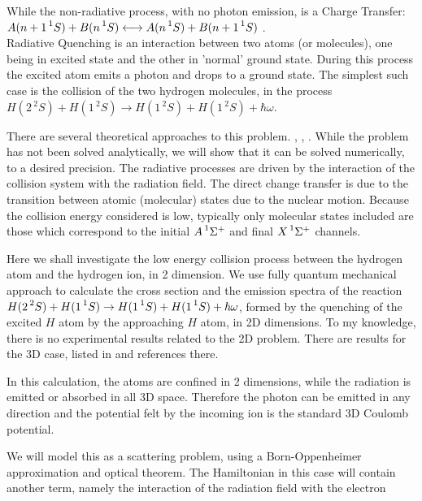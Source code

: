 While the non-radiative process, with no photon emission, is a Charge Transfer: \\
$ A(n+1\prescript{1}{}S) + B(n\prescript{1}{}S) \longleftrightarrow  A(n\prescript{1}{}S) + B(n+1\prescript{1}{}S) $ .\\

Radiative Quenching is an interaction between two atoms (or molecules), one being in excited state and the other in 'normal' ground state. During this process the excited atom emits a photon and drops to a ground state.
The simplest such case is the collision of the two hydrogen molecules, in the process $ H(2\,{}^2\!S) + H(1\,{}^2\!S) \rightarrow H(1\,{}^2\!S) + H(1\,{}^2\!S) + \hbar\omega $.

There are several theoretical approaches to this problem. \cite{RadQuench1}, \cite{RadQuench2}, \cite{Zygelman88}. While the problem has not been solved analytically, we will show that it can be solved numerically, to a desired precision. The radiative processes are driven by the interaction of the collision system with the radiation field. The direct change transfer is due to the transition between atomic (molecular) states due to the nuclear motion. Because the collision energy considered is low, typically only molecular states included are those which correspond to the initial $ A \prescript{1}{}\Sigma^+ $  and final $ X \prescript{1}{}\Sigma^+ $ channels.

Here we shall investigate the low energy collision process between the hydrogen atom and the hydrogen ion, in 2 dimension. We use fully quantum mechanical approach to calculate the cross section and the emission spectra of the reaction $ H(2\prescript{2}{}S) + H(1\prescript{1}{}S)\rightarrow H(1\prescript{1}{}S) + H(1\prescript{1}{}S) + \hbar\omega $, formed by the quenching of the excited $ H $ atom by the approaching $ H $ atom, in 2D dimensions. To my knowledge, there is no experimental results related to the 2D problem. There are results for the 3D case, listed in \cite{Zygelman88} and references there.

In this calculation, the atoms are confined in 2 dimensions, while the radiation is emitted or absorbed in all 3D space. Therefore the photon can be emitted in any direction and the potential felt by the incoming ion is the standard 3D Coulomb potential.

We will model this as a scattering problem, using a Born-Oppenheimer approximation and optical theorem. The Hamiltonian in this case will contain another term, namely the interaction of the radiation field with the electron

